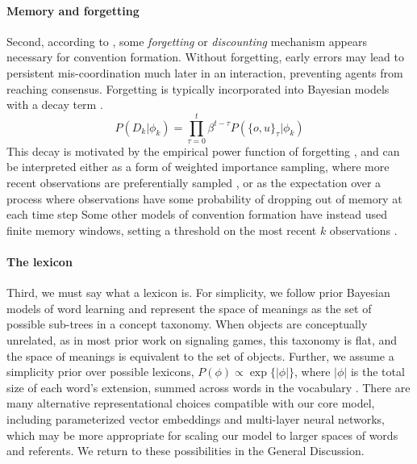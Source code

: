 \paragraph{Memory and forgetting}

Second, according to , some \emph{forgetting} or \emph{discounting} mechanism appears necessary for convention formation. 
Without forgetting, early errors may lead to persistent mis-coordination much later in an interaction, preventing agents from reaching consensus.
Forgetting is typically incorporated into Bayesian models with a decay term \cite{anderson2000adaptive,angela2009sequential,fudenberg2014recency,kalm2018visual}.
$$P(D_k | \phi_k) = \prod_{\tau=0}^t \beta^{t-\tau} P(\{o,u\}_\tau | \phi_k)$$
This decay is motivated by the empirical power function of forgetting \cite{wixted1991form}, and can be interpreted either as a form of weighted importance sampling, where more recent observations are preferentially sampled \cite{pearl2010online}, or as the expectation over a process where observations have some probability of dropping out of memory at each time step 
Some other models of convention formation have instead used finite memory windows, setting a threshold on the most recent $k$ observations \cite{young_evolution_2015}.

\paragraph{The lexicon}

Third, we must say what a lexicon is. 
For simplicity, we follow prior Bayesian models of word learning \cite{XuTenenbaum07_WordLearningBayesian} and represent the space of meanings as the set of possible sub-trees in a concept taxonomy.
When objects are conceptually unrelated, as in most prior work on signaling games, this taxonomy is flat, and the space of meanings is equivalent to the set of objects.
Further, we assume a simplicity prior over possible lexicons, $P(\phi) \propto \exp\{|\phi|\}$, where $|\phi|$ is the total size of each word's extension, summed across words in the vocabulary \cite{FrankGoodmanTenenbaum09_Wurwur}.
There are many alternative representational choices compatible with our core model, including parameterized vector embeddings and multi-layer neural networks, which may be more appropriate for scaling our model to larger spaces of words and referents. 
We return to these possibilities in the General Discussion. 

